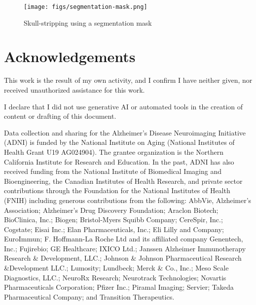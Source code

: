\documentclass[a4paper, 12pt]{article}
\begin{document}
\begin{figure}[htbp]
    \centering
    \texttt{[image: figs/segmentation-mask.png]}
    \caption{Skull-stripping using a segmentation mask}
    \label{fig:segm-mask}
\end{figure}

\newpage
\section{Acknowledgements}

This work is the result of my own activity, and I confirm I have neither given, nor received unauthorized assistance for this work.

I declare that I did not use generative AI or automated tools in the creation of content or drafting of this document.


Data collection and sharing for the Alzheimer's Disease Neuroimaging Initiative (ADNI) is funded by the National
Institute on Aging (National Institutes of Health Grant U19 AG024904). The grantee organization is the Northern
California Institute for Research and Education. In the past, ADNI has also received funding from the National
Institute of Biomedical Imaging and Bioengineering, the Canadian Institutes of Health Research, and private
sector contributions through the Foundation for the National Institutes of Health (FNIH) including generous
contributions from the following: AbbVie, Alzheimer’s Association; Alzheimer’s Drug Discovery Foundation;
Araclon Biotech; BioClinica, Inc.; Biogen; Bristol-Myers Squibb Company; CereSpir, Inc.; Cogstate; Eisai Inc.;
Elan Pharmaceuticals, Inc.; Eli Lilly and Company; EuroImmun; F. Hoffmann-La Roche Ltd and its affiliated
company Genentech, Inc.; Fujirebio; GE Healthcare; IXICO Ltd.; Janssen Alzheimer Immunotherapy Research \&
Development, LLC.; Johnson \& Johnson Pharmaceutical Research \&Development LLC.; Lumosity; Lundbeck;
Merck \& Co., Inc.; Meso Scale Diagnostics, LLC.; NeuroRx Research; Neurotrack Technologies; Novartis
Pharmaceuticals Corporation; Pfizer Inc.; Piramal Imaging; Servier; Takeda Pharmaceutical Company; and
Transition Therapeutics.
\newpage



\end{document}
